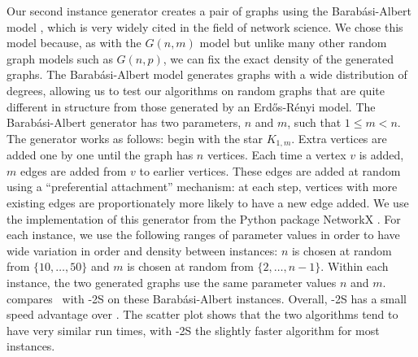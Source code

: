 Our second instance generator creates a pair of graphs using the Barabási-Albert model \citep{barabasi1999emergence},
which is very widely cited in the field of network science.
We chose this model because, as with the $G(n,m)$ model but unlike many other random graph models such
as $G(n,p)$, we can fix the exact density of the generated graphs.
The Barabási-Albert model generates graphs with a wide distribution of degrees, allowing us to test
our algorithms on random graphs that are quite different in structure from those generated by
an Erd\H{o}s-Rényi model.
The Barabási-Albert generator has two parameters, $n$ and $m$, such that
$1 \leq m < n$.  The generator works as follows: begin with the star $K_{1,m}$.
Extra vertices are added one by one until the graph has $n$ vertices.  Each time a vertex $v$ is added,
$m$ edges are added from $v$ to earlier vertices.  These edges are added at random using a ``preferential
attachment'' mechanism: at each step, vertices with more existing edges are proportionately more likely to have a new edge
added.  We use the implementation of this generator from the Python package NetworkX \citep{networkx}.
For each instance, we use the following ranges of parameter values in order to
have wide variation in order and density between instances: $n$ is chosen at random
from $\{10,\dots,50\}$ and $m$ is chosen at random from $\{2,\dots,n-1\}$.  Within each instance, the two
generated graphs use the same parameter values $n$ and $m$.
 compares \McSplit\ with \McSplit-2S on these Barabási-Albert instances.
Overall, \McSplit-2S has a small speed advantage over \McSplit.  The scatter plot shows that the two algorithms
tend to have very similar run times, with \McSplit-2S the slightly faster algorithm for most instances.

